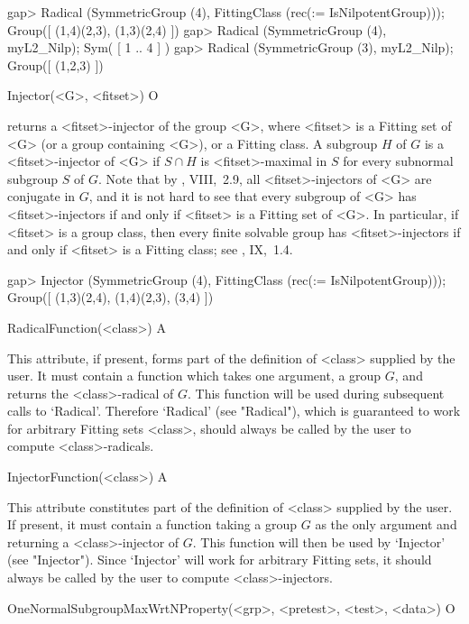 \beginexample
gap> Radical (SymmetricGroup (4), FittingClass (rec(\in := IsNilpotentGroup)));
Group([ (1,4)(2,3), (1,3)(2,4) ])
gap> Radical (SymmetricGroup (4), myL2_Nilp);
Sym( [ 1 .. 4 ] ) 
gap> Radical (SymmetricGroup (3), myL2_Nilp);
Group([ (1,2,3) ])
\endexample

\>Injector(<G>, <fitset>) O

returns a <fitset>-injector of the group <G>, where <fitset> is a
Fitting set of <G> (or a group containing <G>), or a Fitting class. A
subgroup $H$ of $G$ is a <fitset>-injector of <G> if $S \cap H$ is
<fitset>-maximal in $S$ for every subnormal subgroup $S$ of $G$. Note that by 
\cite{DH92}, VIII,~2.9, all <fitset>-injectors of <G> are conjugate in $G$,
and it is not hard to see that every subgroup of <G> has <fitset>-injectors
if and only if <fitset> is a Fitting set of <G>. In particular, if <fitset>
is a group class, then every finite
solvable group has <fitset>-injectors if and only if <fitset> is a Fitting
class; see \cite{DH92}, IX,~1.4.

\beginexample
gap> Injector (SymmetricGroup (4), FittingClass (rec(\in := IsNilpotentGroup)));
Group([ (1,3)(2,4), (1,4)(2,3), (3,4) ])
\endexample

\>RadicalFunction(<class>) A

This attribute, if present, forms part of the definition of <class> supplied
by the user. It must contain a function which takes one argument, a group
$G$, and returns the <class>-radical of $G$. This function
will be used during subsequent calls to `Radical'. Therefore
`Radical' (see "Radical"), which is guaranteed to work for
arbitrary  Fitting sets <class>, should always be called by the user to
compute <class>-radicals.

\>InjectorFunction(<class>) A

This attribute constitutes part of the definition of <class> supplied by the
user. If present, it must contain a function taking a group
$G$ as the only argument and returning a <class>-injector of $G$. This
function will then be used by `Injector' (see "Injector"). Since `Injector'
will work for arbitrary  Fitting sets, it should always be called by the user
to compute <class>-injectors.


\null


\>OneNormalSubgroupMaxWrtNProperty(<grp>, <pretest>, <test>, <data>) O

